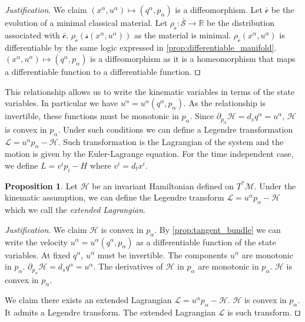 \documentclass[smallextended]{svjour3}
\numberwithin{equation}{section}
\newenvironment{justification}{\emph{Justification}.}{\hfill\(\qed\)}
\theoremstyle{definition}
\newtheorem{prop}[equation]{Proposition}
\newenvironment{justification}{\emph{Justification}.}{\qed}
\begin{document}
\begin{justification}
	We claim $(x^\alpha, u^\alpha) \mapsto (q^\alpha, p_\alpha)$ is a diffeomorphism. Let $\bar{\mathcal{c}}$ be the evolution of a minimal classical material. Let $\rho_{\bar{\mathcal{c}}} : \bar{\mathcal{S}} \rightarrow \mathbb{R}$ be the distribution associated with $\bar{\mathcal{c}}$. $\rho_{\bar{\mathcal{c}}}(\mathcal{s}(x^\alpha, u^\alpha))$ as the material is minimal. $\rho_{\bar{\mathcal{c}}}(x^\alpha, u^\alpha)$ is differentiable by the same logic expressed in \ref{prop:differentiable_manifold}. $(x^\alpha, u^\alpha) \mapsto (q^\alpha, p_\alpha)$ is a diffeomorphism as it is a homeomorphism that maps a differentiable function to a differentiable function.
\end{justification}

This relationship allows us to write the kinematic variables in terms of the state variables. In particular we have $u^\alpha=u^\alpha(q^\alpha, p_\alpha)$. As the relationship is invertible, these functions must be monotonic in $p_\alpha$. Since $\partial_{p_\alpha} \mathcal{H}=d_s q^\alpha= u^\alpha$, $\mathcal{H}$ is convex in $p_\alpha$. Under such conditions we can define a Legendre transformation $\mathcal{L}=u^\alpha p_\alpha - \mathcal{H}$. Such transformation is the Lagrangian of the system and the motion is given by the Euler-Lagrange equation. For the time independent case, we define $L=v^i p_i - H$ where $v^i=d_t x^i$.

\begin{prop}\label{prop:lagrangian}
	Let $\mathcal{H}$ be an invariant Hamiltonian defined on $T^*\mathcal{M}$. Under the kinematic assumption, we can define the Legendre transform $\mathcal{L}=u^\alpha p_\alpha - \mathcal{H}$ which we call the \emph{extended Lagrangian}.
\end{prop}

\begin{justification}
	We claim $\mathcal{H}$ is convex in $p_\alpha$. By \ref{prop:tangent_bundle} we can write the velocity $u^\alpha=u^\alpha(q^\alpha, p_\alpha)$ as a differentiable function of the state variables. At fixed $q^\alpha$, $u^\alpha$ must be invertible. The components $u^\alpha$ are monotonic in $p_\alpha$. $\partial_{p_\alpha} \mathcal{H}=d_s q^\alpha= u^\alpha$. The derivatives of $\mathcal{H}$ in $p_\alpha$ are monotonic in $p_\alpha$. $\mathcal{H}$ is convex in $p_\alpha$.
	
	We claim there exists an extended Lagrangian $\mathcal{L}=u^\alpha p_\alpha - \mathcal{H}$. $\mathcal{H}$ is convex in $p_\alpha$. It admits a Legendre transform. The extended Lagrangian $\mathcal{L}$ is such transform.
\end{justification}
\end{document}
